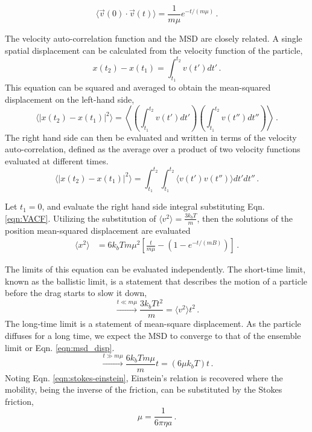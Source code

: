 \begin{equation}\label{eqn:VACF}
	\langle \vec v(0)\cdot \vec v(t)\rangle = \frac{1}{m\mu}e^{-t/(m\mu)} \,.
\end{equation}

The velocity auto-correlation function and the MSD are closely related. A single spatial displacement can be calculated from the velocity function of the particle,
\begin{equation}
    x(t_2) - x(t_1) = \int_{t_1}^{t_2}v(t')dt'\,.
\end{equation}
This equation can be squared and averaged to obtain the mean-squared displacement on the left-hand side,
\begin{equation}
    \langle \left|x(t_2) - x(t_1)\right|^2\rangle = \left\langle\left(\int_{t_1}^{t_2}v(t')dt'\right)\left(\int_{t_1}^{t_2}v(t'')dt''\right)\right\rangle\,.
\end{equation}
The right hand side can then be evaluated and written in terms of the velocity auto-correlation, defined as the average over a product of two velocity functions evaluated at different times.
\begin{equation}
    \langle \left|x(t_2) - x(t_1)\right|^2\rangle = \int_{t_1}^{t_2}\int_{t_1}^{t_2}\langle v(t')v(t'')\rangle dt'dt''\,.
\end{equation}

Let $t_1 = 0$, and evaluate the right hand side integral substituting Eqn. \ref{eqn:VACF}. Utilizing the substitution of $\langle v^2\rangle = \frac{3k_b T}{m}$, then the solutions of the position mean-squared displacement are evaluated
\begin{equation}
	\begin{aligned}
			\langle x^2\rangle &= 6k_b T m \mu^2\left[\frac{t}{m\mu} - (1-e^{-t/(mB)})\right] \,.
	\end{aligned}
\end{equation}

The limits of this equation can be evaluated independently. The short-time limit, known as the ballistic limit, is a statement that describes the motion of a particle before the drag starts to slow it down,
\begin{equation}
    \xrightarrow{t \ll m\mu} \frac{3k_b Tt^2}{m}  = \langle v^2\rangle t^2\,.
\end{equation}
The long-time limit is a statement of mean-square displacement. As the particle diffuses for a long time, we expect the MSD to converge to that of the ensemble limit or Eqn. \ref{eqn:msd_disp}.
\begin{equation}
        \xrightarrow{t \gg m\mu} \frac{6k_b Tm\mu}{m}t  = (6\mu k_b T)t \,.
\end{equation}
Noting Eqn. \ref{eqn:stokes-einstein}, Einstein's relation is recovered where the mobility, being the inverse of the friction, can be substituted by the Stokes friction, 
\begin{equation}
    \mu = \frac{1}{6\pi\eta a}\,.
\end{equation}

